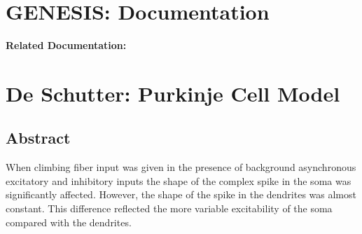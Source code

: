 \documentclass[12pt]{article}
\begin{document}
\section*{GENESIS: Documentation}

{\bf Related Documentation:}

\section*{De Schutter: Purkinje Cell Model}

\subsection*{Abstract}

When climbing fiber input was given in the presence of
background asynchronous excitatory and inhibitory inputs the
shape of the complex spike in the soma was significantly affected.
However, the shape of the spike in the dendrites was almost constant.
This difference reflected the more variable excitability of the
soma compared with the dendrites.
\end{document}

